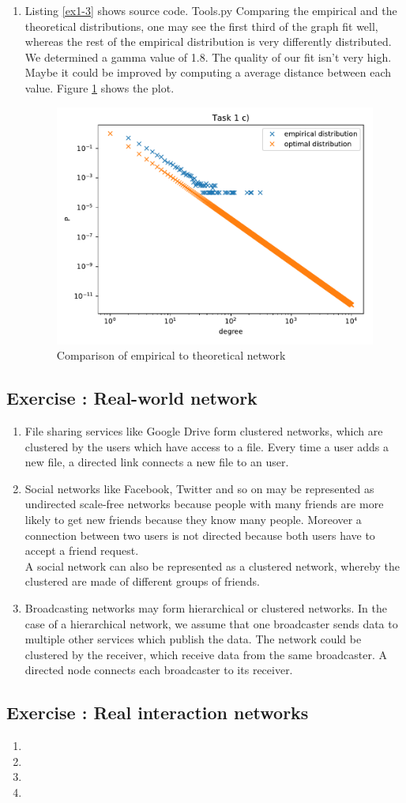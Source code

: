 \documentclass[10pt,a4paper]{article}
\newcommand{\exercise}[1]
{
  \stepcounter{subsection}
  \subsection*{Exercise \thesubsection: #1}

}
\begin{document}
\begin{enumerate}
\item Listing \ref{ex1-3} shows source code.
 {Tools.py}
Comparing the empirical and the theoretical distributions, one may see the first third of the graph fit well, whereas the rest of the empirical distribution is very differently distributed. We determined a gamma value of 1.8. The quality of our fit isn't very high. Maybe it could be improved by computing a average distance between each value. Figure \ref{fig-3} shows the plot.
\begin{figure}
\includegraphics[scale=1]{Figure_3.pdf}
\caption{Comparison of empirical to theoretical network}
\label{fig-3}
\end{figure}
\end{enumerate}

\exercise{Real-world network}
\begin{enumerate}
\item File sharing services like Google Drive form clustered networks, which are clustered by the users which have access to a file. Every time a user adds a new file, a directed link connects a new file to an user.
\item Social networks like Facebook, Twitter and so on may be represented as undirected scale-free networks because people with many friends are more likely to get new friends because they know many people. Moreover a connection between two users is not directed because both users have to accept a friend request.\\
A social network can also be represented as a clustered network, whereby the clustered are made of different groups of friends.
\item Broadcasting networks may form hierarchical or clustered networks. In the case of a hierarchical network, we assume that one broadcaster sends data to multiple other services which publish the data. The network could be clustered by the receiver, which receive data from the same broadcaster. A directed node connects each broadcaster to its receiver.
\end{enumerate}

\exercise{Real interaction networks}
\begin{enumerate}
\item 
\item 
\item 
\item 
\end{enumerate}
\end{document}
